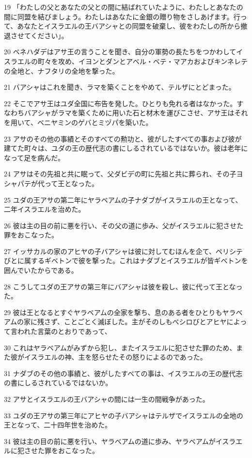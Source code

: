\par 19 「わたしの父とあなたの父との間に結ばれていたように、わたしとあなたの間に同盟を結びましょう。わたしはあなたに金銀の贈り物をさしあげます。行って、あなたとイスラエルの王バアシャとの同盟を破棄し、彼をわたしの所から撤退させてください」。
\par 20 ベネハダデはアサ王の言うことを聞き、自分の軍勢の長たちをつかわしてイスラエルの町々を攻め、イヨンとダンとアベル・ベテ・マアカおよびキンネレテの全地と、ナフタリの全地を撃った。
\par 21 バアシャはこれを聞き、ラマを築くことをやめて、テルザにとどまった。
\par 22 そこでアサ王はユダ全国に布告を発した。ひとりも免れる者はなかった。すなわちバアシャがラマを築くために用いた石と材木を運びこさせ、アサ王はそれを用いて、ベニヤミンのゲバとミヅパを築いた。
\par 23 アサのその他の事績とそのすべての勲功と、彼がしたすべての事および彼が建てた町々は、ユダの王の歴代志の書にしるされているではないか。彼は老年になって足を病んだ。
\par 24 アサはその先祖と共に眠って、父ダビデの町に先祖と共に葬られ、その子ヨシャパテが代って王となった。
\par 25 ユダの王アサの第二年にヤラベアムの子ナダブがイスラエルの王となって、二年イスラエルを治めた。
\par 26 彼は主の目の前に悪を行い、その父の道に歩み、父がイスラエルに犯させた罪をおこなった。
\par 27 イッサカルの家のアヒヤの子バアシャは彼に対してむほんを企て、ペリシテびとに属するギベトンで彼を撃った。これはナダブとイスラエルが皆ギベトンを囲んでいたからである。
\par 28 こうしてユダの王アサの第三年にバアシャは彼を殺し、彼に代って王となった。
\par 29 彼は王となるとすぐヤラベアムの全家を撃ち、息のある者をひとりもヤラベアムの家に残さず、ことごとく滅ぼした。主がそのしもべシロびとアヒヤによって言われた言葉のとおりであって、
\par 30 これはヤラベアムがみずから犯し、またイスラエルに犯させた罪のため、また彼がイスラエルの神、主を怒らせたその怒りによるのであった。
\par 31 ナダブのその他の事績と、彼がしたすべての事は、イスラエルの王の歴代志の書にしるされているではないか。
\par 32 アサとイスラエルの王バアシャの間には一生の間戦争があった。
\par 33 ユダの王アサの第三年にアヒヤの子バアシャはテルザでイスラエルの全地の王となって、二十四年世を治めた。
\par 34 彼は主の目の前に悪を行い、ヤラベアムの道に歩み、ヤラベアムがイスラエルに犯させた罪をおこなった。

